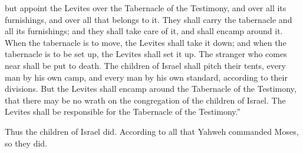 {but appoint the Levites over the Tabernacle of the Testimony, and over all its furnishings, and over all that belongs to it. They shall carry the tabernacle and all its furnishings; and they shall take care of it, and shall encamp around it.
When the tabernacle is to move, the Levites shall take it down; and when the tabernacle is to be set up, the Levites shall set it up. The stranger who comes near shall be put to death.
The children of Israel shall pitch their tents, every man by his own camp, and every man by his own standard, according to their divisions.
But the Levites shall encamp around the Tabernacle of the Testimony, that there may be no wrath on the congregation of the children of Israel. The Levites shall be responsible for the Tabernacle of the Testimony.”
\par }{\PP {}Thus the children of Israel did. According to all that Yahweh commanded Moses, so they did.

}
